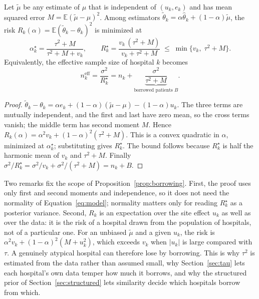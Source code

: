 \documentclass[acmsmall,screen,review]{acmart}
\newcommand{\eff}{\mathrm{eff}}
\theoremstyle{acmdefinition}
\begin{document}
\begin{proposition}\label{prop:borrowing}
Let $\tilde{\mu}$ be any estimate of $\mu$ that is independent of $(u_k,e_k)$ and has mean squared error $M=\mathbb{E}(\tilde{\mu}-\mu)^2$. Among estimators $\tilde{\theta}_k=\alpha\hat{\theta}_k+(1-\alpha)\tilde{\mu}$, the risk $R_k(\alpha)=\mathbb{E}(\tilde{\theta}_k-\theta_k)^2$ is minimized at
\[
\alpha_k^{\star}=\frac{\tau^2+M}{\tau^2+M+v_k},\qquad R_k^{\star}=\frac{v_k\,(\tau^2+M)}{v_k+\tau^2+M}\;\le\;\min\{v_k,\;\tau^2+M\}.
\]
Equivalently, the effective sample size of hospital $k$ becomes
\begin{equation}\label{eq:borrowed}
n_k^{\eff}=\frac{\sigma^2}{R_k^{\star}}=n_k+\underbrace{\frac{\sigma^2}{\tau^2+M}}_{\text{borrowed patients }B}.
\end{equation}
\end{proposition}
\begin{proof}
$\tilde{\theta}_k-\theta_k=\alpha e_k+(1-\alpha)(\tilde{\mu}-\mu)-(1-\alpha)u_k$. The three terms are mutually independent, and the first and last have zero mean, so the cross terms vanish; the middle term has second moment $M$. Hence $R_k(\alpha)=\alpha^2 v_k+(1-\alpha)^2(\tau^2+M)$. This is a convex quadratic in $\alpha$, minimized at $\alpha_k^{\star}$; substituting gives $R_k^{\star}$. The bound follows because $R_k^{\star}$ is half the harmonic mean of $v_k$ and $\tau^2+M$. Finally $\sigma^2/R_k^{\star}=\sigma^2/v_k+\sigma^2/(\tau^2+M)=n_k+B$.
\end{proof}

Two remarks fix the scope of Proposition~\ref{prop:borrowing}. First, the proof uses only first and second moments and independence, so it does not need the normality of Equation~\eqref{eq:model}; normality matters only for reading $R_k^{\star}$ as a posterior variance. Second, $R_k$ is an expectation over the site effect $u_k$ as well as over the data: it is the risk of a hospital drawn from the population of hospitals, not of a particular one. For an unbiased $\tilde{\mu}$ and a given $u_k$, the risk is $\alpha^2 v_k+(1-\alpha)^2(M+u_k^2)$, which exceeds $v_k$ when $|u_k|$ is large compared with $\tau$. A genuinely atypical hospital can therefore lose by borrowing. This is why $\tau^2$ is estimated from the data rather than assumed small, why Section~\ref{sec:tau} lets each hospital's own data temper how much it borrows, and why the structured prior of Section~\ref{sec:structured} lets similarity decide which hospitals borrow from which.
\end{document}
